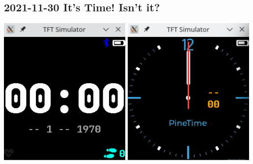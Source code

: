 \documentclass{beamer}
\begin{document}
\subsection{2021-11-30 It's Time! Isn't it?}
\begin{frame}{}
  \centering\includegraphics[width=0.49\textwidth]{../2021-11-30_WatchFaceDigital}
  \centering\includegraphics[width=0.49\textwidth]{../2021-11-30_WatchFaceAnalog}
\end{frame}
\end{document}
